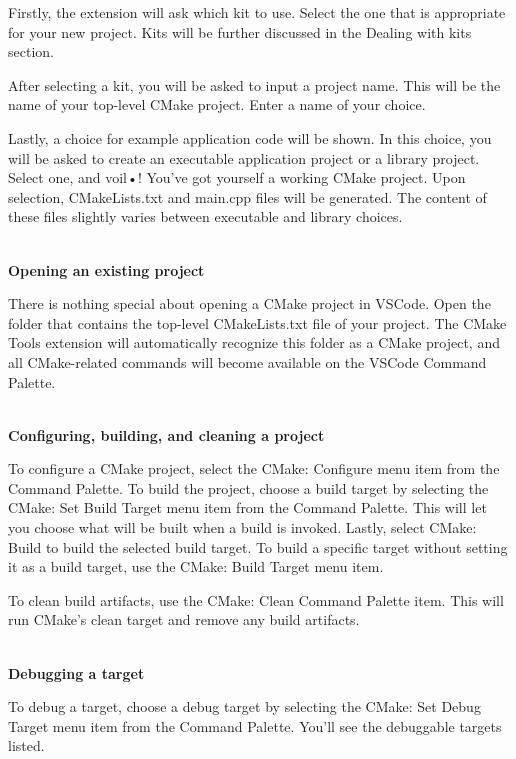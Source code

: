 Firstly, the extension will ask which kit to use. Select the one that is appropriate for your new project. Kits will be further discussed in the Dealing with kits section.

After selecting a kit, you will be asked to input a project name. This will be the name of your top-level CMake project. Enter a name of your choice.

Lastly, a choice for example application code will be shown. In this choice, you will be asked to create an executable application project or a library project. Select one, and voil•! You've got yourself a working CMake project. Upon selection, CMakeLists.txt and main.cpp files will be generated. The content of these files slightly varies between executable and library choices.

\hspace*{\fill} \\ %
\noindent
\textbf{Opening an existing project}

There is nothing special about opening a CMake project in VSCode. Open the folder that contains the top-level CMakeLists.txt file of your project. The CMake Tools extension will automatically recognize this folder as a CMake project, and all CMake-related commands will become available on the VSCode Command Palette.

\hspace*{\fill} \\ %
\noindent
\textbf{Configuring, building, and cleaning a project}

To configure a CMake project, select the CMake: Configure menu item from the Command Palette. To build the project, choose a build target by selecting the CMake: Set Build Target menu item from the Command Palette. This will let you choose what will be built when a build is invoked. Lastly, select CMake: Build to build the selected build target. To build a specific target without setting it as a build target, use the CMake: Build Target menu item.

To clean build artifacts, use the CMake: Clean Command Palette item. This will run CMake's clean target and remove any build artifacts.

\hspace*{\fill} \\ %
\noindent
\textbf{Debugging a target}

To debug a target, choose a debug target by selecting the CMake: Set Debug Target menu item from the Command Palette. You'll see the debuggable targets listed.

